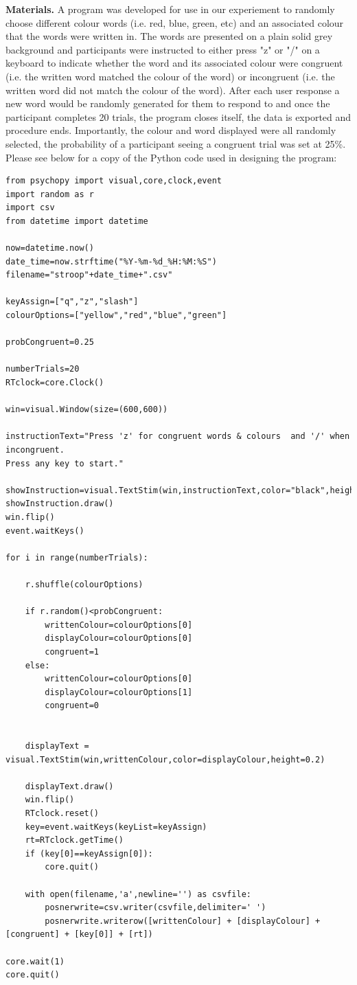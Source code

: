 \documentclass{article}
\begin{document}
\textbf{Materials.} A program was developed for use in our experiement to randomly choose different colour words (i.e. red, blue, green, etc) and an associated colour that the words were written in. The words are presented on a plain solid grey background and participants were instructed to either press "z" or "/" on a keyboard to indicate whether the word and its associated colour were congruent (i.e. the written word matched the colour of the word) or incongruent (i.e. the written word did not match the colour of the word). After each user response a new word would be randomly generated for them to respond to and once the participant completes 20 trials, the program closes itself, the data is exported and procedure ends. Importantly, the colour and word displayed were all randomly selected, the probability of a participant seeing a congruent trial was set at 25\%. \\

Please see below for a copy of the Python code used in designing the program: \\
\begin{verbatim}
from psychopy import visual,core,clock,event
import random as r
import csv
from datetime import datetime

now=datetime.now()
date_time=now.strftime("%Y-%m-%d_%H:%M:%S")
filename="stroop"+date_time+".csv"

keyAssign=["q","z","slash"]
colourOptions=["yellow","red","blue","green"]

probCongruent=0.25

numberTrials=20
RTclock=core.Clock()

win=visual.Window(size=(600,600))

instructionText="Press 'z' for congruent words & colours  and '/' when incongruent. 
Press any key to start."

showInstruction=visual.TextStim(win,instructionText,color="black",height=0.1)
showInstruction.draw()
win.flip()
event.waitKeys()

for i in range(numberTrials):

	r.shuffle(colourOptions)

	if r.random()<probCongruent:
		writtenColour=colourOptions[0]
		displayColour=colourOptions[0]
		congruent=1
	else:
		writtenColour=colourOptions[0]
		displayColour=colourOptions[1]
		congruent=0


	displayText = visual.TextStim(win,writtenColour,color=displayColour,height=0.2)

	displayText.draw()
	win.flip()
	RTclock.reset()
	key=event.waitKeys(keyList=keyAssign)
	rt=RTclock.getTime()
	if (key[0]==keyAssign[0]):
		core.quit()

	with open(filename,'a',newline='') as csvfile:
		posnerwrite=csv.writer(csvfile,delimiter=' ')
		posnerwrite.writerow([writtenColour] + [displayColour] + [congruent] + [key[0]] + [rt])

core.wait(1)
core.quit()
\end{verbatim}
\end{document}
